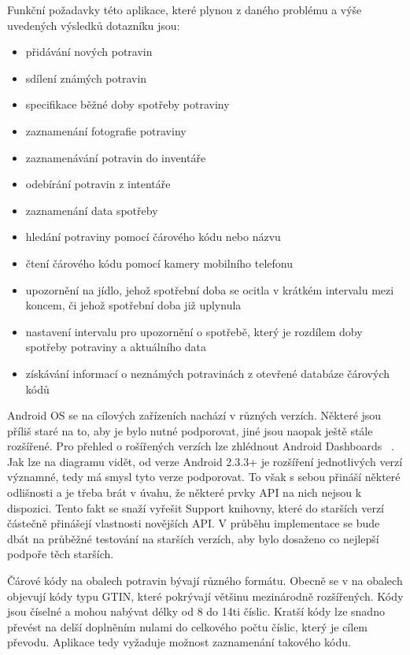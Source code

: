\documentclass[thesis=B,czech]{FITthesis}[2013/10/20]
\begin{document}
Funkční požadavky této aplikace, které plynou z daného problému a výše uvedených výsledků dotazníku jsou:

\begin{itemize}
  \item přidávání nových potravin
  \item sdílení známých potravin
  \item specifikace běžné doby spotřeby potraviny
  \item zaznamenání fotografie potraviny
  \item zaznamenávání potravin do inventáře
  \item odebírání potravin z intentáře
  \item zaznamenání data spotřeby
  \item hledání potraviny pomocí čárového kódu nebo názvu
  \item čtení čárového kódu pomocí kamery mobilního telefonu
  \item upozornění na jídlo, jehož spotřební doba se ocitla v krátkém intervalu mezi koncem, či jehož spotřební doba již uplynula
  \item nastavení intervalu pro upozornění o spotřebě, který je rozdílem doby spotřeby potraviny a aktuálního data
  \item získávání informací o neznámých potravinách z otevřené databáze čárových kódů
\end{itemize}

Android OS se na cílových zařízeních nachází v různých verzích. Některé jsou příliš staré na to, aby je bylo nutné podporovat, jiné jsou naopak ještě stále rozšířené. Pro přehled o rošířených verzích lze zhlédnout Android Dashboards ~\cite{dashboards}. Jak lze na diagramu vidět, od verze Android 2.3.3+ je rozšíření jednotlivých verzí významné, tedy má smysl tyto verze podporovat. To však s sebou přináší některé odlišnosti a je třeba brát v úvahu, že některé prvky API na nich nejsou k dispozici. Tento fakt se snaží vyřešit Support knihovny, které do starších verzí částečně přinášejí vlastnosti novějších API. V průběhu implementace se bude dbát na průběžné testování na starších verzích, aby bylo dosaženo co nejlepší podpoře těch starších.

Čárové kódy na obalech potravin bývají různého formátu. Obecně se v na obalech objevují kódy typu GTIN, které pokrývají většinu mezinárodně rozšířených. Kódy jsou číselné a mohou nabývat délky od 8 do 14ti číslic. Kratší kódy lze snadno převést na delší doplněním nulami do celkového počtu číslic, který je cílem převodu. Aplikace tedy vyžaduje možnost zaznamenání takového kódu.
\end{document}
